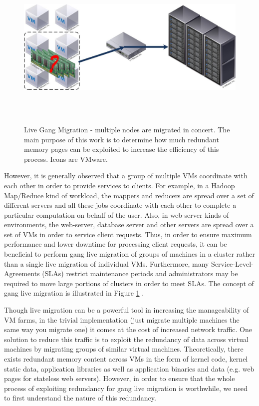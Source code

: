 \documentclass{acm_proc_article-sp}
\begin{document}
\par
\begin{figure}[ht]
\centering
        \includegraphics[height=8cm,width=18cm]{images/gang_migration.jpg}
    \caption{Live Gang Migration - multiple nodes are migrated in concert. The main purpose of this work is to determine how much redundant memory pages can be exploited to increase the efficiency of this process. Icons are \textcopyright VMware.}
    \label{fig:gang_migration}
\end{figure}
However, it is generally observed that a group of multiple VMs coordinate with each other in order to provide services to clients.  For example, in a Hadoop Map/Reduce kind of workload, the mappers and reducers are spread over a set of different servers and all these jobs coordinate with each other to complete a particular computation on behalf of the user. Also, in web-server kinds of environments, the web-server, database server and other servers are spread over a set of VMs in order to service client requests.  Thus, in order to ensure maximum performance and lower downtime for processing client requests, it can be beneficial to perform gang live migration of groups of machines in a cluster rather than a single live migration of individual VMs. Furthermore, many Service-Level-Agreements (SLAs) restrict maintenance periods and administrators may be required to move large portions of clusters in order to meet SLAs.  The concept of gang live migration is illustrated in Figure \ref{fig:gang_migration} \cite{live_gang}.


Though live migration can be a powerful tool in increasing the manageability of VM farms, in the trivial implementation (just migrate multiple machines the same way you migrate one) it comes at the cost of increased network traffic.  One solution to reduce this traffic is to exploit the redundancy of data across virtual machines by migrating groups of similar virtual machines.  Theoretically, there exists redundant memory content across VMs in the form of kernel code, kernel static data, application libraries as well as application binaries and data (e.g. web pages for stateless web servers).  However, in order to ensure that the whole process of exploiting redundancy for gang live migration is worthwhile, we need to first understand the nature of this redundancy.
\end{document}
